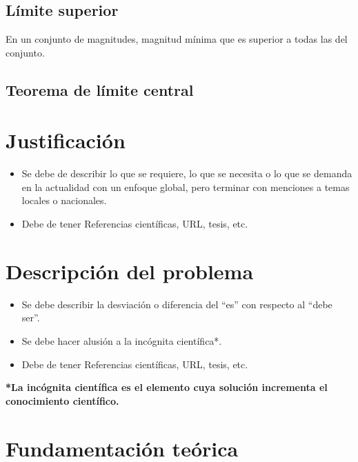     \subsection{Límite superior} 
    
    En un conjunto de magnitudes, magnitud mínima que es superior a todas las del conjunto. \cite{RAE}
    
    \subsection{Teorema de límite central}
    
    
    
    \section{Justificación}
    
    \begin{itemize}
        \item Se debe de describir lo que se requiere, lo que se necesita o lo que se demanda en la actualidad con un enfoque global, pero terminar con menciones a temas locales o nacionales.
        \item Debe de tener Referencias científicas, URL, tesis, etc.
    \end{itemize}
    \section{Descripción del problema}
    \begin{itemize}
        \item Se debe describir la desviación o diferencia del ``es'' con respecto al ``debe ser''.
        \item Se debe hacer alusión a la incógnita científica*.
        \item Debe de tener Referencias científicas, URL, tesis, etc.
    \end{itemize}
    
    \textbf{*La incógnita científica es el elemento cuya solución incrementa el conocimiento científico.}
    \section{Fundamentación teórica}
    
